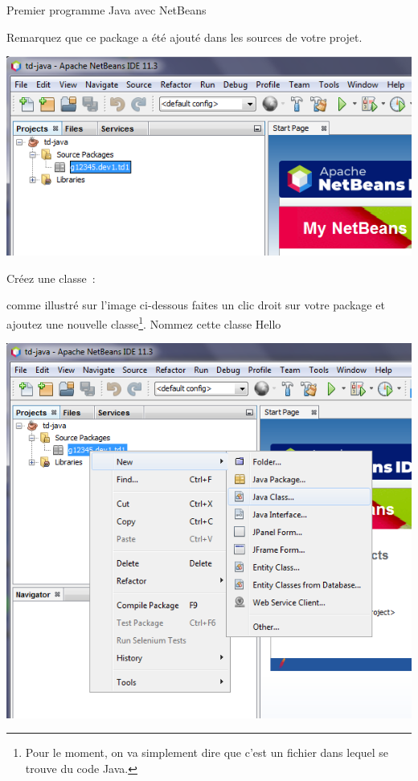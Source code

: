 \documentclass[a4paper,11pt]{style-esi/td}
\begin{document}
\begin{Tutoriel}{Premier programme Java avec NetBeans}
\begin{steps}
		Remarquez que ce package a été ajouté dans les sources de votre projet.
		\bigskip
		\begin{center}
			\includegraphics[width=.9\textwidth]{images/anb113_newproject_package3}
		\end{center}



		\item Créez une classe~:

		comme illustré sur l'image ci-dessous faites un clic droit sur votre package
		et ajoutez une nouvelle classe\footnote{Pour le moment,
			on va simplement dire que c'est un fichier dans lequel se trouve du code Java.}.
		Nommez cette classe {Hello}

		\bigskip

		\begin{center}
			\includegraphics[width=.9\textwidth]{images/anb113_newproject_new_class}
		\end{center}
\newpage


\end{steps}
\end{Tutoriel}
\end{document}
